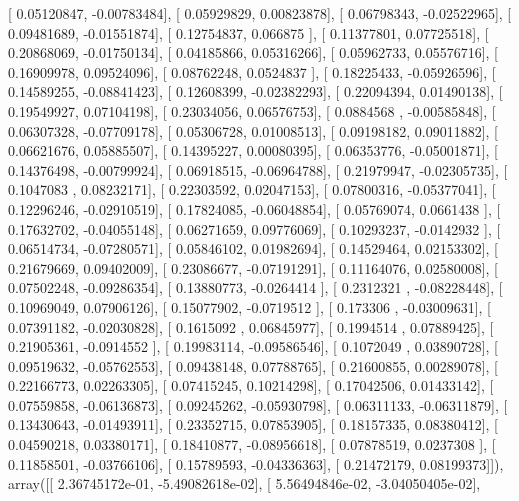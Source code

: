 \documentclass{article}
\begin{document}
       [ 0.05120847, -0.00783484],
       [ 0.05929829,  0.00823878],
       [ 0.06798343, -0.02522965],
       [ 0.09481689, -0.01551874],
       [ 0.12754837,  0.066875  ],
       [ 0.11377801,  0.07725518],
       [ 0.20868069, -0.01750134],
       [ 0.04185866,  0.05316266],
       [ 0.05962733,  0.05576716],
       [ 0.16909978,  0.09524096],
       [ 0.08762248,  0.0524837 ],
       [ 0.18225433, -0.05926596],
       [ 0.14589255, -0.08841423],
       [ 0.12608399, -0.02382293],
       [ 0.22094394,  0.01490138],
       [ 0.19549927,  0.07104198],
       [ 0.23034056,  0.06576753],
       [ 0.0884568 , -0.00585848],
       [ 0.06307328, -0.07709178],
       [ 0.05306728,  0.01008513],
       [ 0.09198182,  0.09011882],
       [ 0.06621676,  0.05885507],
       [ 0.14395227,  0.00080395],
       [ 0.06353776, -0.05001871],
       [ 0.14376498, -0.00799924],
       [ 0.06918515, -0.06964788],
       [ 0.21979947, -0.02305735],
       [ 0.1047083 ,  0.08232171],
       [ 0.22303592,  0.02047153],
       [ 0.07800316, -0.05377041],
       [ 0.12296246, -0.02910519],
       [ 0.17824085, -0.06048854],
       [ 0.05769074,  0.0661438 ],
       [ 0.17632702, -0.04055148],
       [ 0.06271659,  0.09776069],
       [ 0.10293237, -0.0142932 ],
       [ 0.06514734, -0.07280571],
       [ 0.05846102,  0.01982694],
       [ 0.14529464,  0.02153302],
       [ 0.21679669,  0.09402009],
       [ 0.23086677, -0.07191291],
       [ 0.11164076,  0.02580008],
       [ 0.07502248, -0.09286354],
       [ 0.13880773, -0.0264414 ],
       [ 0.2312321 , -0.08228448],
       [ 0.10969049,  0.07906126],
       [ 0.15077902, -0.0719512 ],
       [ 0.173306  , -0.03009631],
       [ 0.07391182, -0.02030828],
       [ 0.1615092 ,  0.06845977],
       [ 0.1994514 ,  0.07889425],
       [ 0.21905361, -0.0914552 ],
       [ 0.19983114, -0.09586546],
       [ 0.1072049 ,  0.03890728],
       [ 0.09519632, -0.05762553],
       [ 0.09438148,  0.07788765],
       [ 0.21600855,  0.00289078],
       [ 0.22166773,  0.02263305],
       [ 0.07415245,  0.10214298],
       [ 0.17042506,  0.01433142],
       [ 0.07559858, -0.06136873],
       [ 0.09245262, -0.05930798],
       [ 0.06311133, -0.06311879],
       [ 0.13430643, -0.01493911],
       [ 0.23352715,  0.07853905],
       [ 0.18157335,  0.08380412],
       [ 0.04590218,  0.03380171],
       [ 0.18410877, -0.08956618],
       [ 0.07878519,  0.0237308 ],
       [ 0.11858501, -0.03766106],
       [ 0.15789593, -0.04336363],
       [ 0.21472179,  0.08199373]]), array([[  2.36745172e-01,  -5.49082618e-02],
       [  5.56494846e-02,  -3.04050405e-02],
\end{document}
